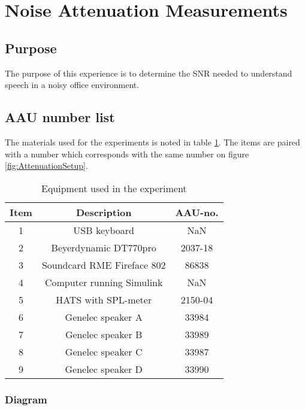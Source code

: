 \section{Noise Attenuation Measurements}

\subsection{Purpose}

The purpose of this experience is to determine the SNR needed to understand speech in a noisy office environment. 

\subsection{AAU number list}
The materials used for the experiments is noted in table \ref{tab:UsedEquipmentListningAttenuation}. The items are paired with a number which corresponds with the same number on figure \ref{fig:AttenuationSetup}.

\begin{table}[h]
	\centering
	
	\begin{tabular}{ c c c } \toprule
		{Item} & {Description} & {AAU-no}. \\ \bottomrule 
		1      	&  USB keyboard							& NaN		\\
		2      	&  Beyerdynamic DT770pro				& 2037-18	\\
		3      	&  Soundcard RME Fireface 802           & 86838		\\
		4      	&  Computer	running Simulink			& NaN		\\  
		5		&  HATS with SPL-meter				& 2150-04	\\
		6      	&  Genelec speaker A					& 33984		\\
		7      	&  Genelec speaker B					& 33989		\\
		8      	&  Genelec speaker C					& 33987		\\
		9      	&  Genelec speaker D					& 33990		\\ \bottomrule 
	\end{tabular}
	\caption{Equipment used in the experiment}
	\label{tab:UsedEquipmentListningAttenuation}
\end{table}



\subsubsection{Diagram}

